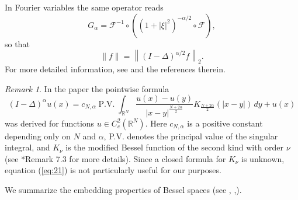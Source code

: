 \documentclass[11pt]{amsart}
\numberwithin{equation}{section}
\theoremstyle{remark}
\newtheorem{remark}[theorem]{Remark}
\theoremstyle{definition}
\begin{document}
In Fourier variables the same operator reads
\begin{equation} \label{eq:19}
G_\alpha = \mathcal{F}^{-1} \circ \left( \left(1+|\xi|^2 \right)^{-\alpha /2} \circ \mathcal{F} \right),
\end{equation}
so that
\[
\|f\| = \left\| (I-\Delta)^{\alpha /2} f \right\|_2.
\]
For more detailed information, see \cites{Adams, Stein} and the references therein.
\begin{remark}
	In the paper \cite{Fall} the pointwise formula
	\begin{equation} \label{eq:21}
	(I-\Delta)^\alpha u(x) = 
	c_{N,\alpha} \operatorname{P.V.} \int_{\mathbb{R}^N} \frac{u(x)-u(y)}{|x-y|^{\frac{N+2\alpha}{2}}} K_{\frac{N+2\alpha}{2}}(|x-y|) \, dy + u(x)
	\end{equation}
	was derived for functions $u \in C_c^2(\mathbb{R}^N)$. 
	Here $c_{N,\alpha}$ is a positive constant depending only on $N$ and $\alpha$, 
	P.V. denotes the principal value of the singular integral, and $K_\nu$ is the modified Bessel 
	function of the second kind with order $\nu$ (see \cite{Fall}*{Remark 7.3} for more details). 
	Since a closed formula for $K_\nu$ is unknown, equation (\ref{eq:21}) is not particularly useful 
	for our purposes.
\end{remark}
We summarize the embedding properties of Bessel spaces (see \cite[Theorem 3.1]{Felmer}, \cite[Chapter V, Section 3]{Stein},\cite[Section 4]{Strichartz}).
\end{document}
